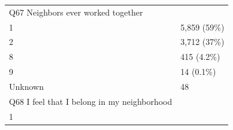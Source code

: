 \documentclass[]{article}
\begin{document}
\begin{longtable}[]{@{}ll@{}}
\begin{minipage}[t]{0.71\columnwidth}\raggedright
Q67 Neighbors ever worked together\strut
\end{minipage} & \begin{minipage}[t]{0.23\columnwidth}\raggedright
\strut
\end{minipage}\tabularnewline
\begin{minipage}[t]{0.71\columnwidth}\raggedright
1\strut
\end{minipage} & \begin{minipage}[t]{0.23\columnwidth}\raggedright
5,859 (59\%)\strut
\end{minipage}\tabularnewline
\begin{minipage}[t]{0.71\columnwidth}\raggedright
2\strut
\end{minipage} & \begin{minipage}[t]{0.23\columnwidth}\raggedright
3,712 (37\%)\strut
\end{minipage}\tabularnewline
\begin{minipage}[t]{0.71\columnwidth}\raggedright
8\strut
\end{minipage} & \begin{minipage}[t]{0.23\columnwidth}\raggedright
415 (4.2\%)\strut
\end{minipage}\tabularnewline
\begin{minipage}[t]{0.71\columnwidth}\raggedright
9\strut
\end{minipage} & \begin{minipage}[t]{0.23\columnwidth}\raggedright
14 (0.1\%)\strut
\end{minipage}\tabularnewline
\begin{minipage}[t]{0.71\columnwidth}\raggedright
Unknown\strut
\end{minipage} & \begin{minipage}[t]{0.23\columnwidth}\raggedright
48\strut
\end{minipage}\tabularnewline
\begin{minipage}[t]{0.71\columnwidth}\raggedright
Q68 I feel that I belong in my neighborhood\strut
\end{minipage} & \begin{minipage}[t]{0.23\columnwidth}\raggedright
\strut
\end{minipage}\tabularnewline
\begin{minipage}[t]{0.71\columnwidth}\raggedright
1\strut
\end{minipage} & \begin{minipage}[t]{0.23\columnwidth}\raggedright

\end{minipage}
\end{longtable}
\end{document}
